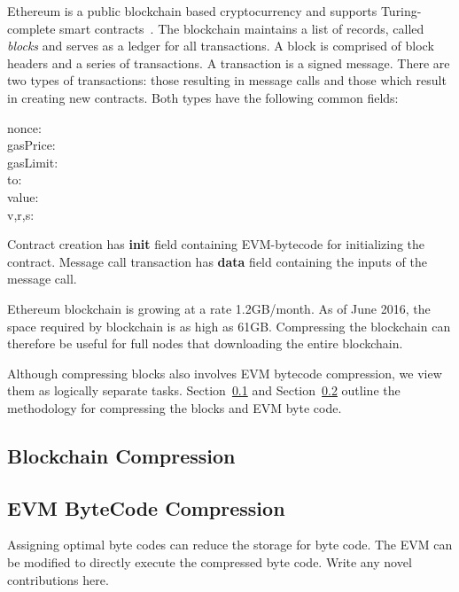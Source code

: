 
Ethereum is a public blockchain based cryptocurrency and supports Turing-complete smart contracts~\cite{ethereum}.
The blockchain maintains a list of records, called \emph{blocks} and serves as a ledger for all transactions.
A block is comprised of block headers and a series of transactions. A transaction is a signed message.
There are two types of transactions: those resulting in message calls and those which result
 in creating new contracts.
Both types have the following common fields:
\begin{description}
  \item[nonce:]
  \item[gasPrice:]
  \item[gasLimit:]
  \item[to:]
  \item[value:]
  \item[v,r,s:]
\end{description}

Contract creation has \textbf{init} field containing EVM-bytecode for initializing the contract.
Message call transaction has \textbf{data} field containing the inputs of the message call.

Ethereum blockchain is growing at a rate 1.2GB/month.
As of June 2016, the space required by blockchain is as high as 61GB.
Compressing the blockchain can therefore be useful for full nodes that downloading the entire blockchain.

Although compressing blocks also involves EVM bytecode compression, we view them as logically separate tasks.
Section~\ref{sec:blockcompress} and 
Section~\ref{sec:evmcompress}  
outline the methodology for compressing the blocks and EVM byte code.

\subsection{Blockchain Compression}\label{sec:blockcompress}


\subsection{EVM ByteCode Compression}\label{sec:evmcompress}

Assigning optimal byte codes can reduce the storage for byte code.
The EVM can be modified to directly execute the compressed byte code.
Write any novel contributions here.
